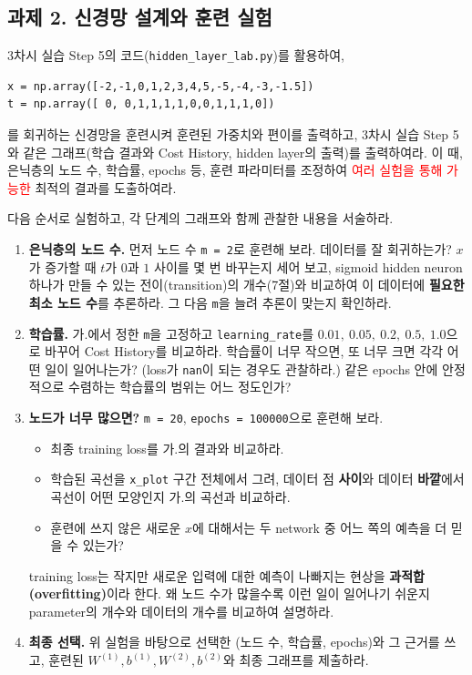\documentclass[11pt,a4paper]{article}
\begin{document}
\subsection*{과제 2. 신경망 설계와 훈련 실험}

3차시 실습 Step 5의 코드(\texttt{hidden\_layer\_lab.py})를 활용하여,

\begin{lstlisting}
x = np.array([-2,-1,0,1,2,3,4,5,-5,-4,-3,-1.5])
t = np.array([ 0, 0,1,1,1,1,0,0,1,1,1,0])
\end{lstlisting}

를 회귀하는 신경망을 훈련시켜 훈련된 가중치와 편이를 출력하고,
3차시 실습 Step 5와 같은 그래프(학습 결과와 Cost History, hidden layer의 출력)를 출력하여라.
이 때, 은닉층의 노드 수, 학습률, epochs 등, 훈련 파라미터를 조정하여
\textcolor{red}{여러 실험을 통해 가능한} 최적의 결과를 도출하여라.


다음 순서로 실험하고, 각 단계의 그래프와 함께 관찰한 내용을 서술하라.

\begin{enumerate}[leftmargin=2.2em]
\item[가.] \textbf{은닉층의 노드 수.}
먼저 노드 수 \texttt{m = 2}로 훈련해 보라. 데이터를 잘 회귀하는가?
$x$가 증가할 때 $t$가 $0$과 $1$ 사이를 몇 번 바꾸는지 세어 보고,
sigmoid hidden neuron 하나가 만들 수 있는 전이(transition)의 개수(7절)와 비교하여
이 데이터에 \textbf{필요한 최소 노드 수}를 추론하라.
그 다음 \texttt{m}을 늘려 추론이 맞는지 확인하라.

\item[나.] \textbf{학습률.}
가.에서 정한 \texttt{m}을 고정하고 \texttt{learning\_rate}를
$0.01,\ 0.05,\ 0.2,\ 0.5,\ 1.0$으로 바꾸어 Cost History를 비교하라.
학습률이 너무 작으면, 또 너무 크면 각각 어떤 일이 일어나는가?
(loss가 \texttt{nan}이 되는 경우도 관찰하라.)
같은 epochs 안에 안정적으로 수렴하는 학습률의 범위는 어느 정도인가?

\item[다.] \textbf{노드가 너무 많으면?}
\texttt{m = 20}, \texttt{epochs = 100000}으로 훈련해 보라.
\begin{itemize}[leftmargin=1.5em]
\item 최종 training loss를 가.의 결과와 비교하라.
\item 학습된 곡선을 \texttt{x\_plot} 구간 전체에서 그려,
데이터 점 \textbf{사이}와 데이터 \textbf{바깥}에서 곡선이 어떤 모양인지 가.의 곡선과 비교하라.
\item 훈련에 쓰지 않은 새로운 $x$에 대해서는 두 network 중 어느 쪽의 예측을 더 믿을 수 있는가?
\end{itemize}
training loss는 작지만 새로운 입력에 대한 예측이 나빠지는 현상을
\textbf{과적합(overfitting)}이라 한다.
왜 노드 수가 많을수록 이런 일이 일어나기 쉬운지 parameter의 개수와 데이터의 개수를 비교하여 설명하라.

\item[라.] \textbf{최종 선택.}
위 실험을 바탕으로 선택한 (노드 수, 학습률, epochs)와 그 근거를 쓰고,
훈련된 $W^{(1)}, b^{(1)}, W^{(2)}, b^{(2)}$와 최종 그래프를 제출하라.
\end{enumerate}
\end{document}
